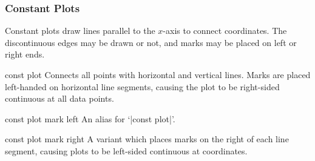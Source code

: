 {\subsubsection{Constant Plots}
Constant plots draw lines parallel to the $x$-axis to connect coordinates. The discontinuous edges may be drawn or not, and marks may be placed on left or right ends.

\begin{plottype}{const plot}
Connects all points with horizontal and vertical lines. Marks are placed left-handed on horizontal line segments, causing the plot to be right-sided continuous at all data points.

\begin{codeexample}[]
\end{codeexample}


\begin{codeexample}[]
\end{codeexample}
\end{plottype}

\begin{plottype}{const plot mark left}
An alias for `|const plot|'.
\end{plottype}

\begin{plottype}{const plot mark right}
 A variant which places marks on the right of each line segment, causing plots to be left-sided continuous at coordinates.
\begin{codeexample}[]
\end{codeexample}
\end{plottype}

}
